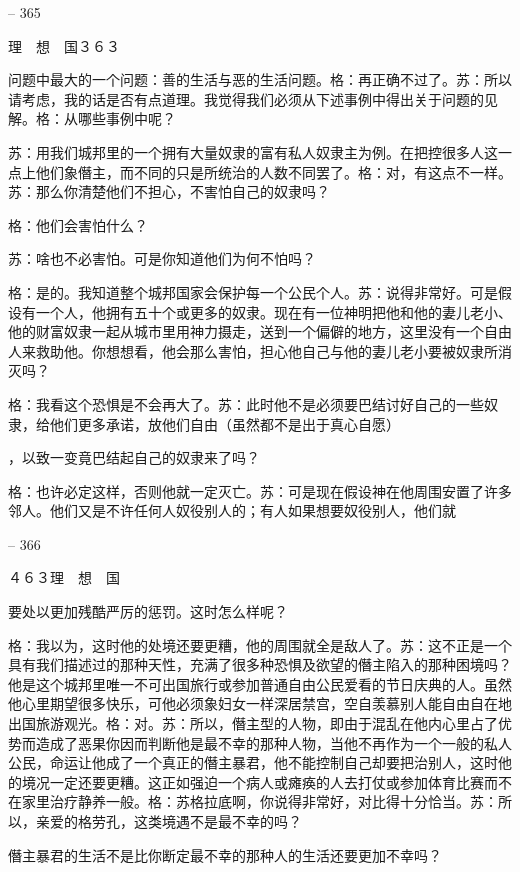 \documentclass[11pt,oneside]{book}
\begin{document}
\begin{common-format}
    

-- 365

    理　想　国３６３

    问题中最大的一个问题：善的生活与恶的生活问题。格：再正确不过了。苏：所以请考虑，我的话是否有点道理。我觉得我们必须从下述事例中得出关于问题的见解。格：从哪些事例中呢？

    苏：用我们城邦里的一个拥有大量奴隶的富有私人奴隶主为例。在把控很多人这一点上他们象僭主，而不同的只是所统治的人数不同罢了。格：对，有这点不一样。苏：那么你清楚他们不担心，不害怕自己的奴隶吗？

    格：他们会害怕什么？

    苏：啥也不必害怕。可是你知道他们为何不怕吗？

    格：是的。我知道整个城邦国家会保护每一个公民个人。苏：说得非常好。可是假设有一个人，他拥有五十个或更多的奴隶。现在有一位神明把他和他的妻儿老小、他的财富奴隶一起从城市里用神力摄走，送到一个偏僻的地方，这里没有一个自由人来救助他。你想想看，他会那么害怕，担心他自己与他的妻儿老小要被奴隶所消灭吗？

    格：我看这个恐惧是不会再大了。苏：此时他不是必须要巴结讨好自己的一些奴隶，给他们更多承诺，放他们自由（虽然都不是出于真心自愿）

    ，以致一变竟巴结起自己的奴隶来了吗？

    格：也许必定这样，否则他就一定灭亡。苏：可是现在假设神在他周围安置了许多邻人。他们又是不许任何人奴役别人的；有人如果想要奴役别人，他们就

    

-- 366

    ４６３理　想　国

    要处以更加残酷严厉的惩罚。这时怎么样呢？

    格：我以为，这时他的处境还要更糟，他的周围就全是敌人了。苏：这不正是一个具有我们描述过的那种天性，充满了很多种恐惧及欲望的僭主陷入的那种困境吗？他是这个城邦里唯一不可出国旅行或参加普通自由公民爱看的节日庆典的人。虽然他心里期望很多快乐，可他必须象妇女一样深居禁宫，空自羡慕别人能自由自在地出国旅游观光。格：对。苏：所以，僭主型的人物，即由于混乱在他内心里占了优势而造成了恶果你因而判断他是最不幸的那种人物，当他不再作为一个一般的私人公民，命运让他成了一个真正的僭主暴君，他不能控制自己却要把治别人，这时他的境况一定还要更糟。这正如强迫一个病人或瘫痪的人去打仗或参加体育比赛而不在家里治疗静养一般。格：苏格拉底啊，你说得非常好，对比得十分恰当。苏：所以，亲爱的格劳孔，这类境遇不是最不幸的吗？

    僭主暴君的生活不是比你断定最不幸的那种人的生活还要更加不幸吗？


\end{common-format}
\end{document}
